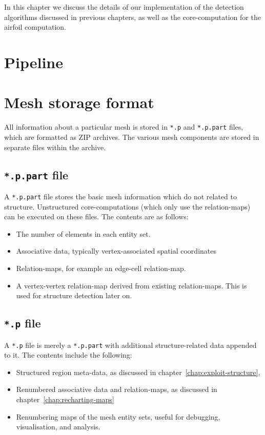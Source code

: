 In this chapter we discuss the details of our implementation of the detection algorithms discussed in previous chapters, as well as the core-computation for the airfoil computation.


\section{Pipeline}

\section{Mesh storage format}
All information about a particular mesh is stored in \texttt{*.p} and \texttt{*.p.part} files, which are formatted as ZIP archives. The various mesh components are stored in separate files within the archive.

\subsection{\texttt{*.p.part} file}
\label{subsec:p-part}
A \texttt{*.p.part} file stores the basic mesh information which do not related to structure. Unstructured core-computations (which only use the relation-maps) can be executed on these files. The contents are as follows:
\begin{itemize}
\item The number of elements in each entity set.
\item Associative data, typically vertex-associated spatial coordinates
\item Relation-maps, for example an edge-cell relation-map.
\item A vertex-vertex relation-map derived from existing relation-maps. This is used for structure detection later on.
\end{itemize}

\subsection{\texttt{*.p} file}
A \texttt{*.p} file is merely a \texttt{*.p.part} with additional structure-related data appended to it. The contents include the following:
\begin{itemize}
\item Structured region meta-data, as discussed in chapter~\ref{chap:exploit-structure},
\item Renumbered associative data and relation-maps, as discussed in chapter~\ref{chap:recharting-maps}
\item Renumbering maps of the mesh entity sets, useful for debugging, visualisation, and analysis.
\end{itemize}



